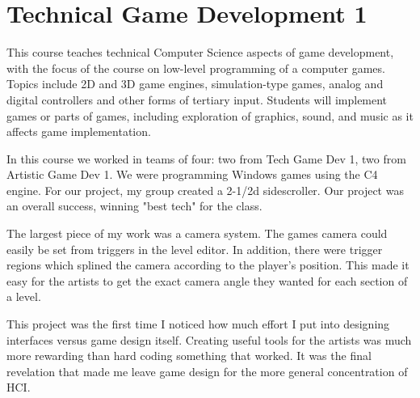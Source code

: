 \section{Technical Game Development 1}

\begin{meta}
\end{meta}


\coursedesc
This course teaches technical Computer Science aspects of game
development, with the focus of the course on low-level programming of a
computer games. Topics include 2D and 3D game engines, simulation-type
games, analog and digital controllers and other forms of tertiary input.
Students will implement games or parts of games, including exploration
of graphics, sound, and music as it affects game implementation.


\courseself
In this course we worked in teams of four: two from Tech Game Dev 1, two
from Artistic Game Dev 1. We were programming Windows games using the
C4 engine. For our project, my group created a 2-1/2d sidescroller. Our
project was an overall success, winning "best tech" for the class.

The largest piece of my work was a camera system. The games camera could
easily be set from triggers in the level editor. In addition, there
were trigger regions which splined the camera according to the player's
position. This made it easy for the artists to get the exact camera
angle they wanted for each section of a level.

This project was the first time I noticed how much effort I put into
designing interfaces versus game design itself. Creating useful tools
for the artists was much more rewarding than hard coding something that
worked. It was the final revelation that made me leave game design for
the more general concentration of HCI.


